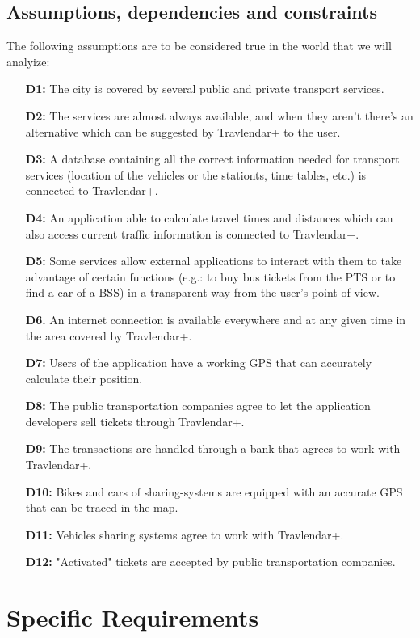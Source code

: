 \documentclass{article}
\begin{document}
\subsection{Assumptions, dependencies and constraints}
The following assumptions are to be considered true in the world that we will analyize:
\begin{enumerate}
\item[\textbf{D1:}] The city is covered by several public and private transport services.
\item[\textbf{D2:}] The services are almost always available, and when they aren’t there’s an alternative which can be suggested by Travlendar+ to the user.
\item[\textbf{D3:}] A database containing all the correct information needed for transport services (location of the vehicles or the stationts, time tables, etc.) is connected to Travlendar+.
\item[\textbf{D4:}] An application able to calculate travel times and distances which can also access current traffic information is connected to Travlendar+.
\item[\textbf{D5:}] Some services allow external applications to interact with them to take advantage of certain functions (e.g.: to buy bus tickets from the PTS or to find a car of a BSS) in a transparent way from the user's point of view.
\item[\textbf{D6.}] An internet connection is available everywhere and at any given time in the area covered by Travlendar+.
\item[\textbf{D7:}] Users of the application have a working GPS that can accurately calculate their position.
\item[\textbf{D8:}] The public transportation companies agree to let the application developers sell tickets through Travlendar+.
\item[\textbf{D9:}] The transactions are handled through a bank that agrees to work with Travlendar+.
\item[\textbf{D10:}] Bikes and cars of sharing-systems are equipped with an accurate GPS that can be traced in the map.
\item[\textbf{D11:}] Vehicles sharing systems agree to work with Travlendar+.
\item[\textbf{D12:}] "Activated" tickets are accepted by public transportation companies.
\end{enumerate}
\newpage
\section{Specific Requirements}
\end{document}
